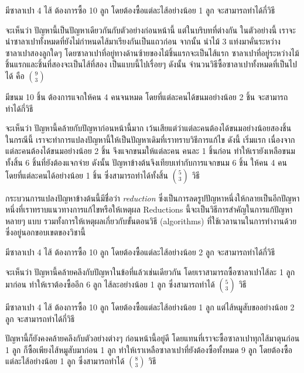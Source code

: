 \begin{example}
มีซาลาเปา 4 ไส้ ต้องการซื้อ 10 ลูก โดยต้องซื้อแต่ละไส้อย่างน้อย 1 ลูก จะสามารถทำได้กี่วิธี

จะเห็นว่า ปัญหานี้เป็นปัญหาเดียวกันกับตัวอย่างก่อนหน้านี้ แต่ในบริบทที่ต่างกัน \enskip ในตัวอย่างนี้ เราจะนำซาลาเปาทั้งหมดที่ยังไม่กำหนดไส้มาเรียงกันเป็นแถวก่อน \enskip จากนั้น นำไม้ 3 แท่งมาคั่นระหว่างซาลาเปาสองลูกใดๆ โดยซาลาเปาที่อยู่ทางด้านซ้ายของไม้ชิ้นแรกจะเป็นไส้แรก ซาลาเปาที่อยู่ระหว่างไม้ชิ้นแรกและชิ้นที่สองจะเป็นไส้ที่สอง เป็นแบบนี้ไปเรื่อยๆ \enskip ดังนั้น จำนวนวิธีซื้อซาลาเปาทั้งหมดที่เป็นไปได้ คือ $\binom{9}{3}$
\end{example}

\begin{example}
มีขนม 10 ชิ้น ต้องการแจกให้คน 4 คนจนหมด โดยที่แต่ละคนได้ขนมอย่างน้อย 2 ชิ้น จะสามารถทำได้กี่วิธี

จะเห็นว่า ปัญหานี้คล้ายกับปัญหาก่อนหน้านี้มาก เว้นเสียแต่ว่าแต่ละคนต้องได้ขนมอย่างน้อยสองชิ้น \enskip ในกรณีนี้ เราจะทำการแปลงปัญหานี้ให้เป็นปัญหาเดิมที่เราทราบวิธีการแก้ไข ดังนี้ \enskip เริ่มแรก เนื่องจากแต่ละคนต้องได้ขนมอย่างน้อย 2 ชิ้น จึงแจกขนมให้แต่ละคน คนละ 1 ชิ้นก่อน ทำให้เรายังเหลือขนมทั้งสิ้น 6 ชิ้นที่ยังต้องแจกจ่าย \enskip ดังนั้น ปัญหาข้างต้นจึงเทียบเท่ากับการแจกขนม 6 ชิ้น ให้คน 4 คน โดยที่แต่ละคนได้อย่างน้อย 1 ชิ้น ซึ่งสามารถทำได้ทั้งสิ้น $\binom{5}{3}$ วิธี
\end{example}

กระบวนการแปลงปัญหาข้างต้นนี้มีชื่อว่า \emph{reduction} ซึ่งเป็นการลดรูปปัญหาหนึ่งให้กลายเป็นอีกปัญหาหนึ่งที่เราทราบแนวทางการแก้ไขหรือให้เหตุผล \enskip Reductions นี้จะเป็นวิธีการสำคัญในการแก้ปัญหาหลายๆ แบบ รวมทั้งการให้เหตุผลเกี่ยวกับขั้นตอนวิธี (algorithms) ที่ใช้เวลานานในการทำงานด้วย ซึ่งอยู่นอกขอบเขตของวิชานี้

\begin{example}
มีซาลาเปา 4 ไส้ ต้องการซื้อ 10 ลูก โดยต้องซื้อแต่ละไส้อย่างน้อย 2 ลูก จะสามารถทำได้กี่วิธี

จะเห็นว่า ปัญหานี้คล้ายคลึงกับปัญหาในข้อที่แล้วเช่นเดียวกัน โดยเราสามารถซื้อซาลาเปาไส้ละ 1 ลูกมาก่อน ทำให้เราต้องซื้ออีก 6 ลูก ไส้ละอย่างน้อย 1 ลูก ซึ่งสามารถทำได้ $\binom{5}{3}$ วิธี
\end{example}

\begin{example}
มีซาลาเปา 4 ไส้ ต้องการซื้อ 10 ลูก โดยต้องซื้อแต่ละไส้อย่างน้อย 1 ลูก แต่ไส้หมูสับขออย่างน้อย 2 ลูก จะสามารถทำได้กี่วิธี

ปัญหานี้ก็ยังคงคล้ายคลึงกับตัวอย่างต่างๆ ก่อนหน้านี้อยู่ดี โดยแทนที่เราจะซื้อซาลาเปาทุกไส้มาตุนก่อน 1 ลูก ก็ซื้อเพียงไส้หมูสับมาก่อน 1 ลูก ทำให้เราเหลือซาลาเปาที่ยังต้องซื้อทั้งหมด 9 ลูก โดยต้องซื้อแต่ละไส้อย่างน้อย 1 ลูก ซึ่งสามารถทำได้ $\binom{8}{3}$ วิธี
\end{example}

